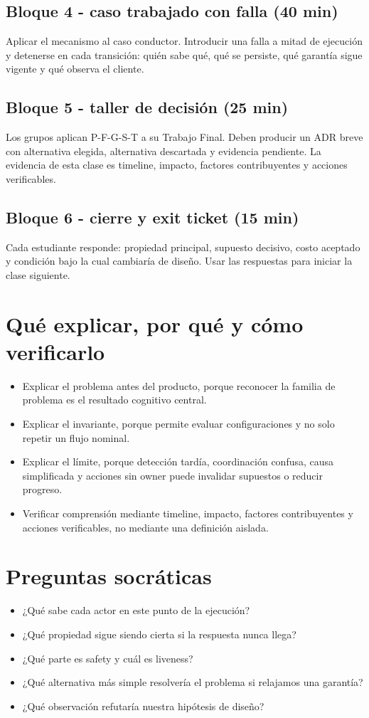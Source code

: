 \documentclass[variant=docente,cover=institutional,mode=screen]{ua-engineering-v6-article}
\begin{document}
\subsection*{Bloque 4 - caso trabajado con falla (40 min)}
Aplicar el mecanismo al caso conductor. Introducir una falla a mitad de ejecución y detenerse en cada transición: quién sabe qué, qué se persiste, qué garantía sigue vigente y qué observa el cliente.

\subsection*{Bloque 5 - taller de decisión (25 min)}
Los grupos aplican P-F-G-S-T a su Trabajo Final. Deben producir un ADR breve con alternativa elegida, alternativa descartada y evidencia pendiente. La evidencia de esta clase es timeline, impacto, factores contribuyentes y acciones verificables.

\subsection*{Bloque 6 - cierre y exit ticket (15 min)}
Cada estudiante responde: propiedad principal, supuesto decisivo, costo aceptado y condición bajo la cual cambiaría de diseño. Usar las respuestas para iniciar la clase siguiente.

\section{Qué explicar, por qué y cómo verificarlo}
\begin{itemize}
\item Explicar el problema antes del producto, porque reconocer la familia de problema es el resultado cognitivo central.
\item Explicar el invariante, porque permite evaluar configuraciones y no solo repetir un flujo nominal.
\item Explicar el límite, porque detección tardía, coordinación confusa, causa simplificada y acciones sin owner puede invalidar supuestos o reducir progreso.
\item Verificar comprensión mediante timeline, impacto, factores contribuyentes y acciones verificables, no mediante una definición aislada.
\end{itemize}

\section{Preguntas socráticas}
\begin{itemize}
\item ¿Qué sabe cada actor en este punto de la ejecución?
\item ¿Qué propiedad sigue siendo cierta si la respuesta nunca llega?
\item ¿Qué parte es safety y cuál es liveness?
\item ¿Qué alternativa más simple resolvería el problema si relajamos una garantía?
\item ¿Qué observación refutaría nuestra hipótesis de diseño?
\end{itemize}
\end{document}
